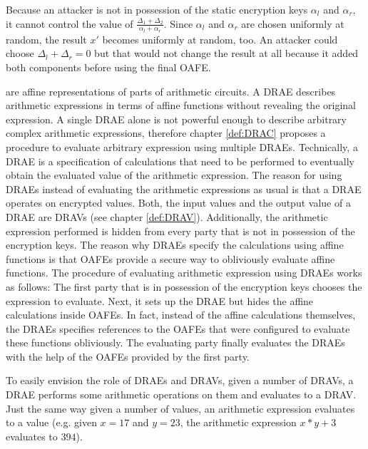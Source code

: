 Because an attacker is not in possession of the static encryption keys
$\alpha_l$ and $\alpha_r$, it cannot control the value of $\frac{\Delta_1 +
\Delta_2}{\alpha_l + \alpha_r}$. Since $\alpha_l$ and $\alpha_r$ are chosen
uniformly at random, the result $x'$ becomes uniformly at random, too. An
attacker could choose $\Delta_l + \Delta_r = 0$ but that would not change the
result at all because it added both components before using the final OAFE.


%
%
\label{sec:drae}

 are affine representations of
parts of arithmetic circuits. A DRAE describes arithmetic expressions in terms
of affine functions without revealing the original expression. A single DRAE
alone is not powerful enough to describe arbitrary complex arithmetic
expressions, therefore chapter \ref{def:DRAC} proposes a procedure to evaluate
arbitrary expression using multiple DRAEs. Technically, a DRAE is a
specification of calculations that need to be performed to eventually obtain the
evaluated value of the arithmetic expression. The reason for using DRAEs instead
of evaluating the arithmetic expressions as usual is that a DRAE operates on
encrypted values. Both, the input values and the output value of a DRAE are
DRAVs (see chapter \ref{def:DRAV}). Additionally, the arithmetic expression
performed is hidden from every party that is not in possession of the encryption
keys.  The reason why DRAEs specify the calculations using affine functions is
that OAFEs provide a secure way to obliviously evaluate affine functions. The
procedure of evaluating arithmetic expression using DRAEs works as follows: The
first party that is in possession of the encryption keys chooses the expression
to evaluate.  Next, it sets up the DRAE but hides the affine calculations inside
OAFEs. In fact, instead of the affine calculations themselves, the DRAEs
specifies references to the OAFEs that were configured to evaluate these
functions obliviously. The evaluating party finally evaluates the DRAEs with the
help of the OAFEs provided by the first party.

To easily envision the role of DRAEs and DRAVs, given a number of DRAVs, a DRAE
performs some arithmetic operations on them and evaluates to a DRAV. Just the
same way given a number of values, an arithmetic expression evaluates to a value
(e.g. given $x=17$ and $y=23$, the arithmetic expression $x*y + 3$ evaluates to
$394$).

